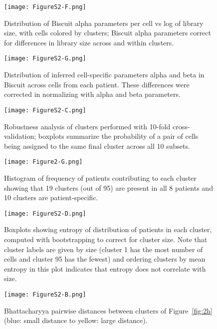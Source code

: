 \begin{figure}
\centering
\texttt{[image: FigureS2-F.png]}
\caption{Distribution of Biscuit alpha parameters per cell vs log of library size, with cells colored by clusters; Biscuit alpha parameters correct for differences in library size across and within clusters.
}
\label{fig:s2f}
\end{figure}

\begin{figure}
\centering
\texttt{[image: FigureS2-G.png]}
\caption{Distribution of inferred cell-specific parameters alpha and beta in Biscuit across cells from each patient. These differences were corrected in normalizing with alpha and beta parameters.
}
\label{fig:s2g}
\end{figure}

\begin{figure}
\centering
\texttt{[image: FigureS2-C.png]}
\caption{Robustness analysis of clusters performed with 10-fold cross-validation; boxplots summarize the probability of a pair of cells being assigned to the same final cluster across all 10 subsets.
}
\label{fig:s2c}
\end{figure}

\begin{figure}
\centering
\texttt{[image: Figure2-G.png]}
\caption{Histogram of frequency of patients contributing to each cluster showing that 19 clusters (out of 95) are present in all 8 patients and 10 clusters are patient-specific.
}
\label{fig:2g}
\end{figure}

\begin{figure}
\centering
\texttt{[image: FigureS2-D.png]}
\caption{Boxplots showing entropy of distribution of patients in each cluster, computed with bootstrapping to correct for cluster size. Note that cluster labels are given by size (cluster 1 has the most number of cells and cluster 95 has the fewest) and ordering clusters by mean entropy in this plot indicates that entropy does not correlate with size.
}
\label{fig:s2d}
\end{figure}

\begin{figure}
\centering
\texttt{[image: FigureS2-B.png]}
\caption{Bhattacharyya pairwise distances between clusters of Figure~\ref{fig:2h} (blue: small distance to yellow: large distance).
}
\label{fig:s2b}
\end{figure}


